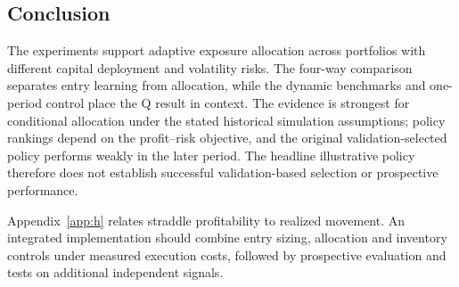 
\subsection*{Conclusion}

The experiments support adaptive exposure allocation across portfolios with different capital deployment and volatility risks. The four-way comparison separates entry learning from allocation, while the dynamic benchmarks and one-period control place the Q result in context. The evidence is strongest for conditional allocation under the stated historical simulation assumptions; policy rankings depend on the profit--risk objective, and the original validation-selected policy performs weakly in the later period. The headline illustrative policy therefore does not establish successful validation-based selection or prospective performance.

Appendix~\ref{app:h} relates straddle profitability to realized movement. An integrated implementation should combine entry sizing, allocation and inventory controls under measured execution costs, followed by prospective evaluation and tests on additional independent signals.


\FloatBarrier
